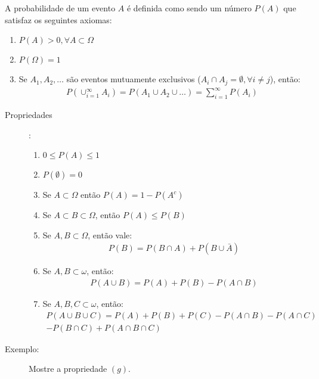 A probabilidade de um evento $A$ é definida como sendo um número $P(A)$ que satisfaz
os seguintes axiomas:
\begin{enumerate}[leftmargin=*, label=\Roman*., widest=IV, align=left]
  \item $P(A) > 0, \forall A \subset \Omega$ 
  \item $P(\Omega)=1$
  \item Se $A_1, A_2,\ldots$ são eventos mutuamente exclusivos ($A_i \cap A_j = \emptyset, \forall i \neq j$), então:
    \begin{align}
      P(\cup^\infty_{i=1} A_i)= P(A_1\cup A_2 \cup \ldots)= \sum^\infty_{i=1} P(A_i) 
    \end{align}
\end{enumerate}
\begin{description}
  \item[Propriedades]:

    \begin{enumerate}[label=(\alph*)]
      \item $0 \le P(A) \le 1$
      \item $P(\emptyset)=0$
      \item Se $A \subset \Omega$ então $P(A)=1-P(A^c)$
      \item Se $A \subset B \subset \Omega$, então $P(A) \le P(B)$
      \item Se $A,B \subset \Omega$, então vale:
        \begin{align}
          P(B)= P(B\cap A)+ P(B\cup \bar{A})
        \end{align}
      \item Se $A,B \subset \omega$, então:
        \begin{align}
          P(A\cup B)= P(A)+P(B)-P(A\cap B)
        \end{align}
      \item Se $A,B,C \subset \omega$, então:
        \begin{align}
          P(A\cup B \cup C)= P(A)+P(B)+P(C)-P(A \cap B)- P(A \cap C) \nonumber\\-
          P(B\cap C)+P(A\cap B \cap C) 
        \end{align}
    \end{enumerate}
  \item [Exemplo:] Mostre a propriedade $(g)$.


\end{description}

